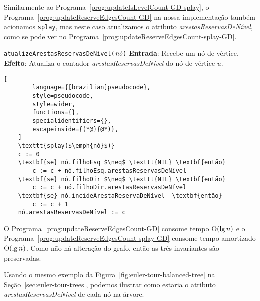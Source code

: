 \raggedbottom

Similarmente ao Programa~\ref{prog:updateIsLevelCount-GD-splay}, o Programa~\ref{prog:updateReserveEdgesCount-GD} na nossa implementação também acionamos \texttt{splay}, mas neste caso atualizamos o atributo \textit{arestasReservasDeNível}, como se pode ver no Programa~\ref{prog:updateReserveEdgesCount-splay-GD}. 

\begin{programruledcaption}{\texttt{atualizeArestasReservasDeNível($\emph{nó}$)} \label{prog:updateReserveEdgesCount-splay-GD}}
    \noindent\textbf{Entrada}: Recebe um nó de vértice.
    \\
    \noindent\textbf{Efeito}: Atualiza o contador \textit{arestasReservasDeNível} do nó de vértice $u$.
    \vspace{-0.5\baselineskip}
    \begin{lstlisting}[
        language={[brazilian]pseudocode},
        style=pseudocode,
        style=wider,
        functions={},
        specialidentifiers={},
        escapeinside={(*@}{@*)},
    ]
    \texttt{splay($\emph{nó}$)}
    c := 0
    \textbf{se} nó.filhoEsq $\neq$ \texttt{NIL} \textbf{então}
        c := c + nó.filhoEsq.arestasReservasDeNível
    \textbf{se} nó.filhoDir $\neq$ \texttt{NIL} \textbf{então}
        c := c + nó.filhoDir.arestasReservasDeNível
    \textbf{se} nó.incideArestaReservaDeNível  \textbf{então}
        c := c + 1
    nó.arestasReservasDeNível := c
    \end{lstlisting}
    \vspace{-0.5\baselineskip}
\end{programruledcaption}

O Programa~\ref{prog:updateReserveEdgesCount-GD} consome tempo $\mathrm{O}(\lg n)$ e o Programa~\ref{prog:updateReserveEdgesCount-splay-GD} consome tempo amortizado $\mathrm{O}(\lg n)$. Como não há alteração do grafo, então as três invariantes são preservadas.

Usando o mesmo exemplo da Figura~\ref{fig:euler-tour-balanced-tree} na Seção~\ref{sec:euler-tour-trees}, podemos ilustrar como estaria o atributo \textit{arestasReservasDeNível} de cada nó na árvore.

